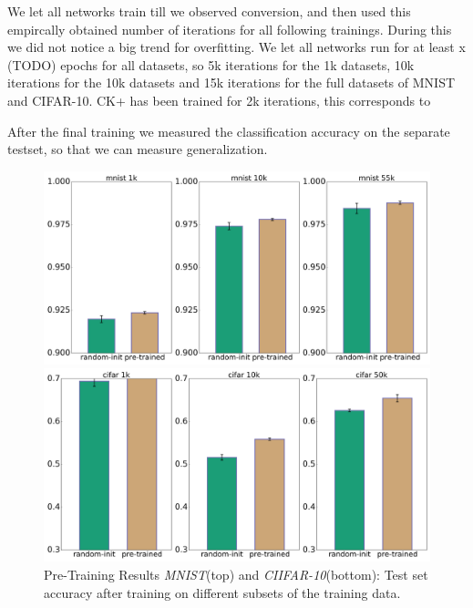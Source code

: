 \documentclass{article}
\begin{document}
    We let all networks train till we observed conversion, and then used this empircally obtained number of iterations for all following trainings.
    During this we did not notice a big trend for overfitting.
    We let all networks run for at least x (TODO) epochs for all datasets, so 5k iterations for the 1k datasets, 10k iterations for the 10k datasets and 15k iterations for the full datasets of MNIST and CIFAR-10. CK+ has been trained for 2k iterations, this corresponds to 

    After the final training we measured the classification accuracy on the separate testset, so that we can measure generalization.
    \begin{figure}
      \centering

      \includegraphics[width=.8\linewidth]{../box_plots/boxplots_mnist.png}

      \includegraphics[width=.8\linewidth]{../box_plots/boxplots_cifar.png}

      \caption{Pre-Training Results \emph{MNIST}(top) and \emph{CIIFAR-10}(bottom): Test set accuracy after training on different subsets of the training data.}
      \label{fig:mnist_cifar_plot}
    \end{figure}
\end{document}
